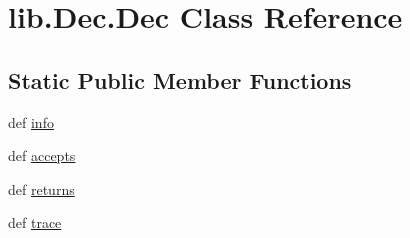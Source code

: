 \hypertarget{classlib_1_1_dec_1_1_dec}{\section{lib.\-Dec.\-Dec Class Reference}
\label{classlib_1_1_dec_1_1_dec}
}
\subsection*{Static Public Member Functions}
\begin{DoxyCompactItemize}
\item 
def \hyperlink{classlib_1_1_dec_1_1_dec_a69ba89d91be2944c8ba77b8c6988a788}{info}
\item 
def \hyperlink{classlib_1_1_dec_1_1_dec_ade919170625403846760d4ec1b30f691}{accepts}
\item 
def \hyperlink{classlib_1_1_dec_1_1_dec_ae09f5250c9d50c8ab2269c8797e470e0}{returns}
\item 
def \hyperlink{classlib_1_1_dec_1_1_dec_a414388e7d0357f00664a4dfdfd1988ad}{trace}
\end{DoxyCompactItemize}


